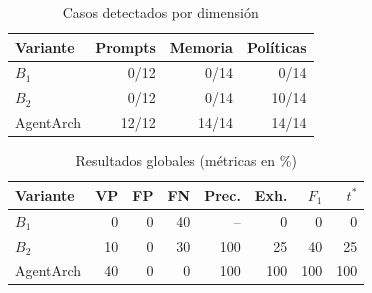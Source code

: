 \begin{table}[H]
\caption{Casos detectados por dimensión}
\label{tab:category_results}
\centering\footnotesize\setlength{\tabcolsep}{3pt}
\begin{tabular}{lrrr}
\hline
Variante & Prompts & Memoria & Políticas\\
\hline
$B_1$ & 0/12 & 0/14 & 0/14\\
$B_2$ & 0/12 & 0/14 & 10/14\\
AgentArch & 12/12 & 14/14 & 14/14\\
\hline
\end{tabular}
\end{table}
\begin{table}[H]
\caption{Resultados globales (métricas en \%)}
\label{tab:experimental_results}
\centering\footnotesize\setlength{\tabcolsep}{3pt}
\begin{tabular}{lrrrrrrr}
\hline
Variante & VP & FP & FN & Prec. & Exh. & $F_1$ & $t^*$\\
\hline
$B_1$ & 0 & 0 & 40 & -- & 0 & 0 & 0\\
$B_2$ & 10 & 0 & 30 & 100 & 25 & 40 & 25\\
AgentArch & 40 & 0 & 0 & 100 & 100 & 100 & 100\\
\hline
\end{tabular}
\end{table}
